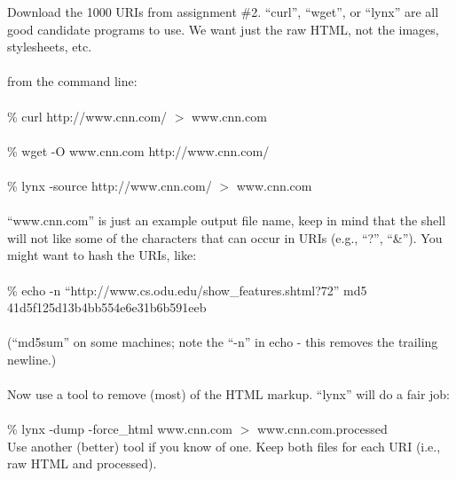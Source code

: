 Download the 1000 URIs from assignment \#2.  \enquote{curl}, \enquote{wget}, or
\enquote{lynx} are all good candidate programs to use.  We want just the
raw HTML, not the images, stylesheets, etc.\\
\\
from the command line:\\
\\
\% curl http://www.cnn.com/ $>$ www.cnn.com\\
\\
\% wget -O www.cnn.com http://www.cnn.com/\\
\\
\% lynx -source http://www.cnn.com/ $>$ www.cnn.com\\
\\
\enquote{www.cnn.com} is just an example output file name, keep in mind
that the shell will not like some of the characters that can occur
in URIs (e.g., \enquote{?}, \enquote{\&}).  You might want to hash the URIs, like:\\
\\
\% echo -n \enquote{http://www.cs.odu.edu/show\_features.shtml?72} \textbar  md5 \\
41d5f125d13b4bb554e6e31b6b591eeb\\
\\
(\enquote{md5sum} on some machines; note the \enquote{-n} in echo -\- this removes
the trailing newline.) \\
\\
Now use a tool to remove (most) of the HTML markup.  \enquote{lynx} will
do a fair job:\\
\\
\% lynx -dump -force\_html www.cnn.com $>$ www.cnn.com.processed
\\
Use another (better) tool if you know of one.  Keep both files 
for each URI (i.e., raw HTML and processed). 